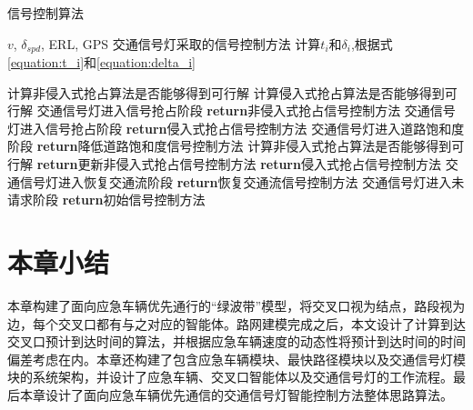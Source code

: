 \begin{breakablealgorithm}
	\caption{信号控制算法} 
	\label{alg}
	\begin{algorithmic}[1]
		\REQUIRE ${v}$, ${\delta_{spd}}$, ERL, GPS
		\ENSURE 交通信号灯采取的信号控制方法
			\STATE 计算${t_i}$和${\delta_i}$,根据式\ref{equation:t_i}和\ref{equation:delta_i}
		
				\STATE 计算非侵入式抢占算法是否能够得到可行解
				\STATE 计算侵入式抢占算法是否能够得到可行解
					\STATE 交通信号灯进入信号抢占阶段
					\STATE \textbf{return}非侵入式抢占信号控制方法
					\STATE 交通信号灯进入信号抢占阶段
					\STATE \textbf{return}侵入式抢占信号控制方法
				\ELSE 
						\STATE 交通信号灯进入道路饱和度阶段
					\ENDIF
					\STATE \textbf{return}降低道路饱和度信号控制方法
				\ENDIF
						\STATE 计算非侵入式抢占算法是否能够得到可行解
							\STATE \textbf{return}更新非侵入式抢占信号控制方法
						\ELSE 
							\STATE \textbf{return}侵入式抢占信号控制方法
						\ENDIF
					\ENDIF
						\STATE 交通信号灯进入恢复交通流阶段
						\STATE \textbf{return}恢复交通流信号控制方法
					\ENDIF
				\ENDIF
			\ELSE
					\STATE 交通信号灯进入未请求阶段
					\STATE \textbf{return}初始信号控制方法
				\ENDIF
			\ENDIF
		\ENDWHILE
	\end{algorithmic}
\end{breakablealgorithm}

\section{本章小结}
本章构建了面向应急车辆优先通行的“绿波带”模型，将交叉口视为结点，路段视为边，每个交叉口都有与之对应的智能体。路网建模完成之后，本文设计了计算到达交叉口预计到达时间的算法，并根据应急车辆速度的动态性将预计到达时间的时间偏差考虑在内。本章还构建了包含应急车辆模块、最快路径模块以及交通信号灯模块的系统架构，并设计了应急车辆、交叉口智能体以及交通信号灯的工作流程。最后本章设计了面向应急车辆优先通信的交通信号灯智能控制方法整体思路算法。
